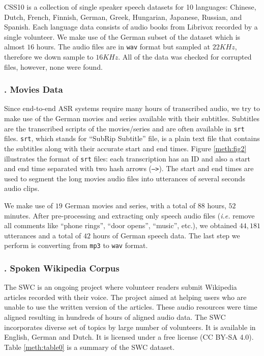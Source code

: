 CSS10 is a collection of single speaker speech datasets for 10 languages: Chinese, Dutch, French, Finnish, German, Greek, Hungarian, Japanese, Russian, and Spanish. Each language data consists of audio books from Librivox recorded by a single volunteer. We make use of the German subset of the dataset which is almost $16$ hours. The audio files are in \texttt{wav} format but sampled at $22 KHz$, therefore we down sample to $16 KHz$. All of the data was checked for corrupted files, however, none were found.

\subsubsection{. Movies Data}
\label{meth:s2_sub4_subsub5}


Since end-to-end \ac{ASR} systems require many hours of transcribed audio, we try to make use of the German movies and series available with their subtitles. Subtitles are the transcribed scripts of the movies/series and are often available in \texttt{srt} files. \texttt{srt}, which stands for \enquote{SubRip Subtitle} file, is a plain text file that contains the subtitles along with their accurate start and end times. Figure \ref{meth:fig2} illustrates the format of \texttt{srt} files: each transcription has an ID and also a start and end time separated with two hash arrows (\texttt{-->}). The start and end times are used to segment the long movies audio files into utterances of several seconds audio clips. 

We make use of $19$ German movies and series, with a total of $88$ hours, $52$ minutes. After pre-processing and extracting only speech
audio files (\textit{i.e.} remove all comments like \enquote{phone rings}, \enquote{door opens}, \enquote{music}, etc.), we obtained $44,181$ utterances and a total of $42$ hours of German speech data. The last step we perform is converting from \texttt{mp3} to \texttt{wav} format. 

\subsubsection{. Spoken Wikipedia Corpus}
\label{meth:s2_sub4_subsub6}

The \ac{SWC} is an ongoing project where volunteer readers submit Wikipedia articles recorded with their voice. The project aimed at helping users who are unable to use the written version of the articles. These audio resources were time aligned resulting in hundreds of hours of aligned audio data. The \ac{SWC} incorporates diverse set of topics by large number of volunteers. It is available in English, German and Dutch. It is licensed under a free license (CC BY-SA 4.0). Table \ref{meth:table0} is a summary of the \ac{SWC} dataset.

